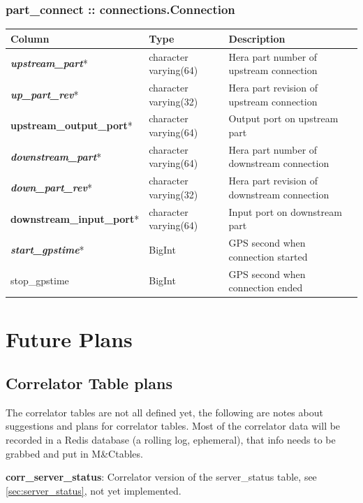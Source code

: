 \documentclass{article}
\newcommand{\mc}{M\&C}
\begin{document}
\subsubsection{part\_connect :: connections.Connection}
\begin{center}
\begin{tabular}{| p{4cm} | p{2cm} | p{10cm} |}
\hline
{\bf Column} & {\bf Type} & {\bf Description} \\ \hline
{\bf \em upstream\_part}* &  character varying(64) & Hera part number of upstream connection \\ \hline
{\bf \em up\_part\_rev}* & character varying(32) & Hera part revision of upstream connection \\ \hline
{\bf upstream\_output\_port}* & character varying(64) & Output port on upstream part \\ \hline
{\bf \em downstream\_part}* & character varying(64) & Hera part number of downstream connection \\ \hline
{\bf \em down\_part\_rev}* & character varying(32) & Hera part revision of downstream connection \\ \hline
{\bf downstream\_input\_port}* & character varying(64) & Input port on downstream part \\ \hline
{\bf \em start\_gpstime}* & BigInt & GPS second when connection started \\ \hline
stop\_gpstime & BigInt & GPS second when connection ended \\ \hline
\end{tabular}
\end{center}


\section{Future Plans}
\label{sec:future}
\subsection{Correlator Table plans}
\label{sec:corr_future}
The correlator tables are not all defined yet, the following are notes about suggestions and plans for correlator tables. Most of the correlator data will be recorded in a Redis database (a rolling log, ephemeral), that info needs to be grabbed and put in \mc tables.

\textbf{corr\_server\_status}: Correlator version of the server\_status table, see \ref{sec:server_status}, not yet implemented.
\end{document}
